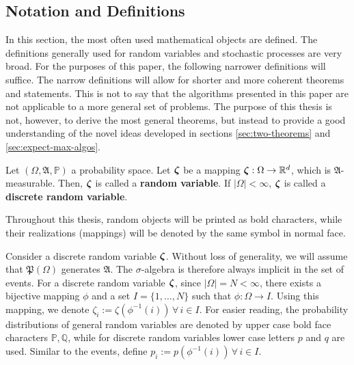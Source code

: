 \subsection{Notation and Definitions}
In this section, the most often used mathematical objects are defined.
The definitions generally used for random variables and stochastic processes are very broad.
For the purposes of this paper, the following narrower definitions will suffice.
The narrow definitions will allow for shorter and more coherent theorems and statements.
This is not to say that the algorithms presented in this paper are not applicable to a more general set of problems.
The purpose of this thesis is not, however, to derive the most general theorems, but instead to provide a good understanding of the novel ideas developed in sections \ref{sec:two-theorems} and \ref{sec:expect-max-algos}.
\begin{definition}
  \label{def:random_variable}
  Let $(\Omega, \mathfrak{A}, \mathbb{P})$ a probability space.
  Let $\boldsymbol\zeta$ be a mapping $\boldsymbol\zeta:\Omega\rightarrow\mathbb{R}^d$, which is $\mathfrak{A}$-measurable.
  Then, $\boldsymbol\zeta$ is called a \textbf{random variable}.
  If $|\Omega|<\infty$, $\boldsymbol\zeta$ is called a \textbf{discrete random variable}.
  \end{definition}
\begin{remark}
  Throughout this thesis, random objects will be printed as bold characters, while their realizations (mappings) will be denoted by the same symbol in normal face.
\end{remark}
\begin{remark}
  \label{remark:discrete-randvar-indexsets}
  Consider a discrete random variable $\boldsymbol\zeta$.
  Without loss of generality, we will assume that $\mathfrak{P}(\Omega)$ generates $\mathfrak{A}$.
  The $\sigma$-algebra is therefore always implicit in the set of events.
  For a discrete random variable $\boldsymbol\zeta$, since $|\Omega|=N<\infty$, there exists a bijective mapping $\phi$ and a set $I=\{1,\ldots, N\}$ such that $\phi:\Omega \rightarrow I$.
  Using this mapping, we denote $\zeta_i := \zeta(\phi^{-1}(i))\,\forall\,i\in I$.
  For easier reading, the probability distributions of general random variables are denoted by upper case bold face characters $\mathbb{P,Q}$, while for discrete random variables lower case letters $p$ and $q$ are used.
  Similar to the events, define $p_i := p(\phi^{-1}(i))\,\forall\,i\in I$.
\end{remark}
